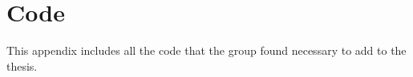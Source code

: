 \chapter{Code}
This appendix includes all the code that the group found necessary to add to the thesis. 
\newpage

